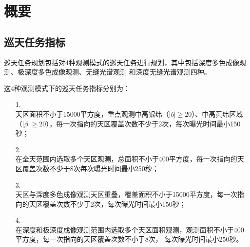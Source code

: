 
\chapter{概要}


\section{巡天任务指标}

巡天任务规划包括对4种观测模式的巡天任务进行规划，其中包括深度多色成像观测、极深度多色成像观测、无缝光谱观测
和深度无缝光谱观测四种。

这4种观测模式下的巡天任务指标分别为：
\begin{itemize}
\item[1.] \\
天区面积不小于15000平方度，重点观测中高银纬（$|b|\ge 20$\textdegree）、中高黄纬区域
（$|\beta|\ge20$\textdegree），每一次指向的天区覆盖次数不少于2次，每次曝光时间最小150秒；
\item[2.] \\
在全天范围内选取多个天区观测，总面积不小于400平方度，每一次指向的天区覆盖次数不少于8次每次曝光时间最小250秒；
\item[3.] \\
天区与深度多色成像观测天区重叠，覆盖面积不小于15000平方度，每一次指向的天区覆盖次数不少于2次，每次曝光时间最小150秒；
\item[4.] \\
在深度和极深度成像观测范围内选取多个天区面积观测，观测面积不小于400平方度，每一次指向的天区覆盖次数不小于8次，
每次曝光时间最小250秒。
\end{itemize}





